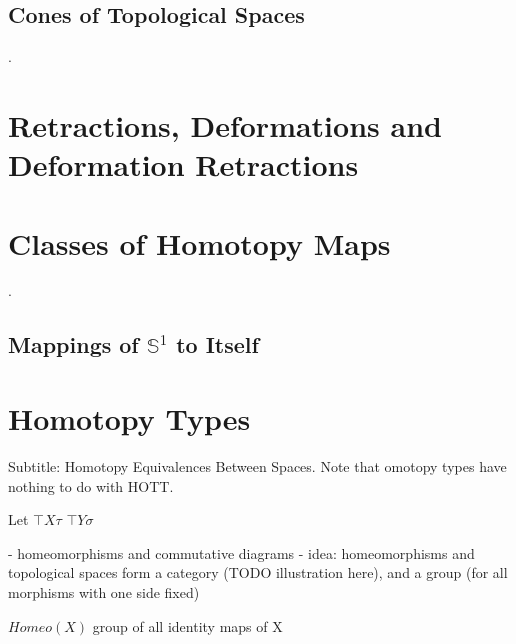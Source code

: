 \documentclass[10pt]{article}
\begin{document}
\subsection{Cones of Topological Spaces}

.

\section{Retractions, Deformations and Deformation Retractions}





\section{Classes of Homotopy Maps}

.

\subsection{Mappings of $\mathbb{S}^1$ to Itself}


\section{Homotopy Types}

Subtitle: Homotopy Equivalences Between Spaces. Note that omotopy types have nothing to do with HOTT.


Let $\top{X}{\tau}$ $\top{Y}{\sigma}$

- homeomorphisms and commutative diagrams
- idea: homeomorphisms and topological spaces form a category (TODO illustration here), and a group (for all morphisms with one side fixed)


$Homeo(X)$ group of all identity maps of X
\end{document}
